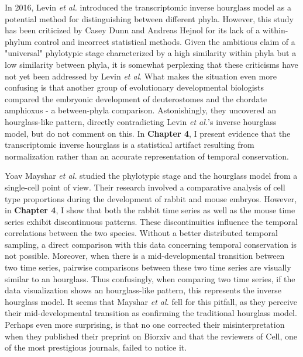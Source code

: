 In 2016, Levin \textit{et al.} introduced the transcriptomic inverse hourglass model as a potential method for distinguishing between different phyla\cite{Levin2016}. However, this study has been criticized by Casey Dunn and Andreas Hejnol for its lack of a within-phylum control\cite{hejnol2016} and incorrect statistical methods\cite{Dunn2018}. Given the ambitious claim of a "universal" phylotypic stage characterized by a high similarity within phyla but a low similarity between phyla, it is somewhat perplexing that these criticisms have not yet been addressed by Levin \textit{et al}. What makes the situation even more confusing is that another group of evolutionary developmental biologists compared the embryonic development of deuterostomes and the chordate amphioxus - a between-phyla comparison. Astonishingly, they uncovered an hourglass-like pattern\cite{PerezPosada2022}, directly contradicting Levin \textit{et al.}'s inverse hourglass model, but do not comment on this. In \textbf{Chapter 4}, I present evidence that the transcriptomic inverse hourglass is a statistical artifact resulting from normalization rather than an accurate representation of temporal conservation. 

Yoav Mayshar \textit{et al.} studied the phylotypic stage and the hourglass model from a single-cell point of view\cite{Mayshar2023}. Their research involved a comparative analysis of cell type proportions during the development of rabbit and mouse embryos. However, in \textbf{Chapter 4}, I show that both the rabbit time series as well as the mouse time series exhibit discontinuous patterns. These discontinuities influence the temporal correlations between the two species. Without a better distributed temporal sampling, a direct comparison with this data concerning temporal conservation is not possible. Moreover, when there is a mid-developmental transition between two time series, pairwise comparisons between these two time series are visually similar to an hourglass. Thus confusingly, when comparing two time series, if the data visualization shows an hourglass-like pattern, this represents the inverse hourglass model. It seems that Mayshar \textit{et al.} fell for this pitfall, as they perceive their mid-developmental transition as confirming the traditional hourglass model. Perhaps even more surprising, is that no one corrected their misinterpretation when they published their preprint on Biorxiv and that the reviewers of Cell, one of the most prestigious journals, failed to notice it.

